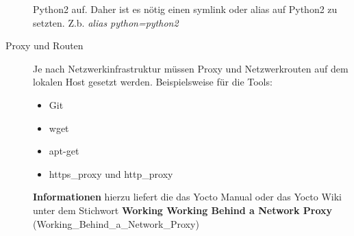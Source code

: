 \begin{description}
        Python2 auf. Daher ist es nötig einen  symlink  oder alias
        auf Python2 zu setzten. Z.b. \textit{alias python=python2}
    \item[Proxy und Routen]
    Je nach Netzwerkinfrastruktur müssen Proxy und Netzwerkrouten auf
    dem lokalen Host gesetzt werden. Beispielsweise für die Tools:
        \begin{itemize}
            \item Git
            \item wget
            \item apt-get
            \item https\_proxy und http\_proxy
        \end{itemize}
        \textbf{Informationen} hierzu liefert die das Yocto Manual oder das
            Yocto Wiki unter dem Stichwort \glqq \textbf{Working Working Behind
            a Network Proxy} \grqq (Working\_Behind\_a\_Network\_Proxy)

\end{description}

